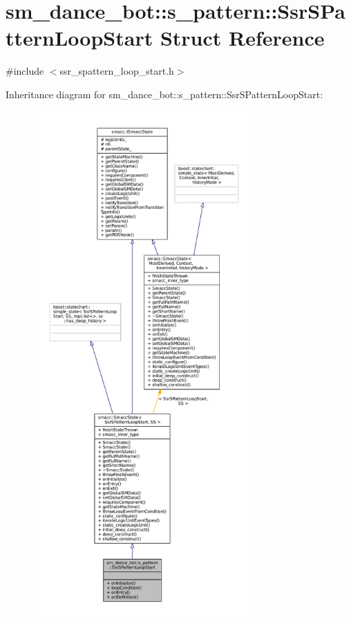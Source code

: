 \hypertarget{structsm__dance__bot_1_1s__pattern_1_1SsrSPatternLoopStart}{}\section{sm\+\_\+dance\+\_\+bot\+:\+:s\+\_\+pattern\+:\+:Ssr\+S\+Pattern\+Loop\+Start Struct Reference}
\label{structsm__dance__bot_1_1s__pattern_1_1SsrSPatternLoopStart}


{\ttfamily \#include $<$ssr\+\_\+spattern\+\_\+loop\+\_\+start.\+h$>$}



Inheritance diagram for sm\+\_\+dance\+\_\+bot\+:\+:s\+\_\+pattern\+:\+:Ssr\+S\+Pattern\+Loop\+Start\+:
\nopagebreak
\begin{figure}[H]
\begin{center}
\leavevmode
\includegraphics[height=550pt]{structsm__dance__bot_1_1s__pattern_1_1SsrSPatternLoopStart__inherit__graph}
\end{center}
\end{figure}


